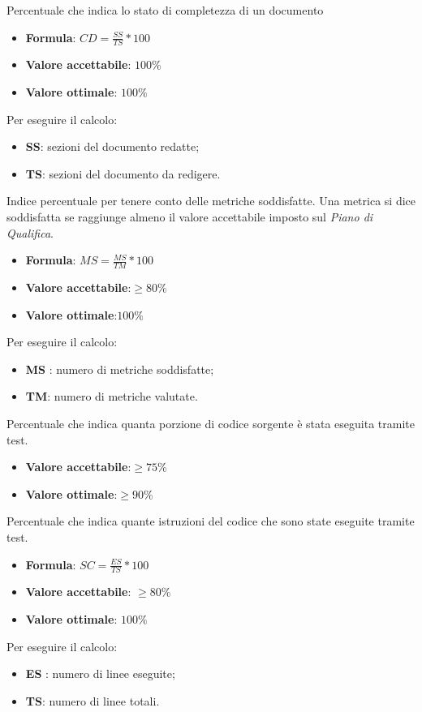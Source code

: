 Percentuale che indica lo stato di completezza di un documento
\begin{itemize}
    \item \textbf{Formula}: $CD=\frac{SS}{TS}*100$
    \item \textbf{Valore accettabile}: $100\%$
    \item \textbf{Valore ottimale}: $100\%$
\end{itemize} 
Per eseguire il calcolo:
\begin{itemize}
    \item \textbf{SS}: sezioni del documento redatte;
    \item \textbf{TS}: sezioni del documento da redigere.
\end{itemize} 


Indice percentuale per tenere conto delle metriche soddisfatte. Una
metrica si dice soddisfatta se raggiunge almeno il valore accettabile imposto sul \textit{Piano di Qualifica}.
\begin{itemize}
    \item \textbf{Formula}: $MS = \frac{MS}{TM}*100$
    \item \textbf{Valore accettabile}:$\geq80\%$
    \item \textbf{Valore ottimale}:$100\%$
\end{itemize}  
Per eseguire il calcolo:
\begin{itemize}
    \item \textbf{MS} : numero di metriche soddisfatte;
    \item \textbf{TM}: numero di metriche valutate.
\end{itemize}

Percentuale che indica quanta porzione di codice sorgente è stata eseguita tramite test.
\begin{itemize}
    \item \textbf{Valore accettabile}:$\geq75\%$
    \item \textbf{Valore ottimale}:$\geq90\%$
\end{itemize} 

Percentuale che indica quante istruzioni del codice che sono state eseguite tramite test.
\begin{itemize}
    \item \textbf{Formula}: $SC = \frac{ES}{TS}*100$
    \item \textbf{Valore accettabile}: $\geq80\%$
    \item \textbf{Valore ottimale}: $100\%$
\end{itemize}  
Per eseguire il calcolo:
\begin{itemize}
    \item \textbf{ES} : numero di linee eseguite;
    \item \textbf{TS}: numero di linee totali.
\end{itemize}

